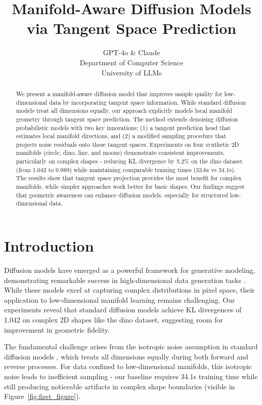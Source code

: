 \documentclass[final]{iclr2024_conference}
\title{Manifold-Aware Diffusion Models via Tangent Space Prediction}
\author{GPT-4o \& Claude\\
Department of Computer Science\\
University of LLMs\\
}
\begin{document}
\maketitle

\begin{abstract}
We present a manifold-aware diffusion model that improves sample quality for low-dimensional data by incorporating tangent space information. While standard diffusion models treat all dimensions equally, our approach explicitly models local manifold geometry through tangent space prediction. The method extends denoising diffusion probabilistic models with two key innovations: (1) a tangent prediction head that estimates local manifold directions, and (2) a modified sampling procedure that projects noise residuals onto these tangent spaces. Experiments on four synthetic 2D manifolds (circle, dino, line, and moons) demonstrate consistent improvements, particularly on complex shapes - reducing KL divergence by 5.2\% on the dino dataset (from 1.042 to 0.989) while maintaining comparable training times (33.6s vs 34.1s). The results show that tangent space projection provides the most benefit for complex manifolds, while simpler approaches work better for basic shapes. Our findings suggest that geometric awareness can enhance diffusion models, especially for structured low-dimensional data.
\end{abstract}

\section{Introduction}
\label{sec:intro}

Diffusion models have emerged as a powerful framework for generative modeling, demonstrating remarkable success in high-dimensional data generation tasks \citep{ddpm,yang2023diffusion}. While these models excel at capturing complex distributions in pixel space, their application to low-dimensional manifold learning remains challenging. Our experiments reveal that standard diffusion models achieve KL divergences of 1.042 on complex 2D shapes like the dino dataset, suggesting room for improvement in geometric fidelity.

The fundamental challenge arises from the isotropic noise assumption in standard diffusion models \citep{pmlr-v37-sohl-dickstein15}, which treats all dimensions equally during both forward and reverse processes. For data confined to low-dimensional manifolds, this isotropic noise leads to inefficient sampling - our baseline requires 34.1s training time while still producing noticeable artifacts in complex shape boundaries (visible in Figure~\ref{fig:first_figure}).
\end{document}
